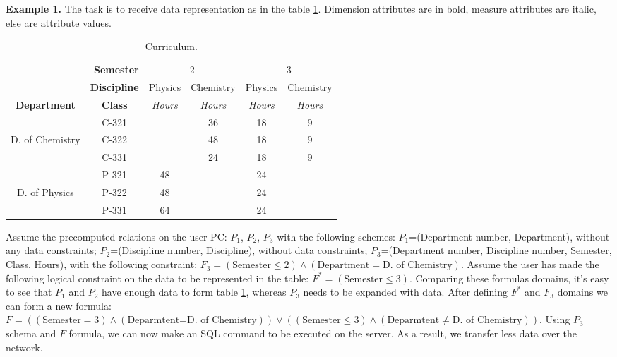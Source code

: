 \documentclass[10pt,a4paper]{article}
\begin{document}
{\bf Example 1.} The task is to receive data representation as in the table
\ref{def_T_1}. Dimension attributes are in bold, measure attributes are italic,
else are attribute values.

\begin{table}[h!]
\caption{\label{def_T_1} Curriculum.}
\begin{center}
\begin{tabular}{|c|c||c|c|c|c|}
\cline{2-6}
\multicolumn{1}{c|}{} & \multicolumn{1}{|r||}{\bf Semester} & \multicolumn{2}{|c|}{2} & \multicolumn{2}{|c|}{3}  \\
\cline{2-6}
\multicolumn{1}{c|}{} & {\bf Discipline} & Physics & Chemistry & Physics & Chemistry \\
\hline \cline{2-6}
{\bf Department} & {\bf Class} & {\it Hours} & {\it Hours} & {\it Hours} & {\it Hours} \\
\hline
 & C-321 & & 36 & 18 & 9 \\
\cline{2-6}
D. of Chemistry & C-322 & & 48 & 18 & 9 \\
\cline{2-6}
 & C-331 & & 24 & 18 & 9 \\
\hline
 & P-321 & 48 & & 24 & \\
\cline{2-6}
D. of Physics & P-322 & 48 & & 24 & \\
\cline{2-6}
 & P-331 & 64 & & 24 & \\
\hline
\end{tabular}
\end{center}
\end{table}
Assume the precomputed relations on the user PC:  $P_1$,
$P_2$, $P_3$ with the following schemes: $P_1$=(Department number, Department), without any data constraints; $P_2$=(Discipline number, Discipline), without data constraints; $P_3$=(Department number, Discipline number, Semester, Class, Hours), with the following constraint:
$F_3 =(\mbox{Semester} \leq 2) \wedge (\mbox{Department} = \mbox{D. of Chemistry})$.
Assume the user has made the following logical constraint on the data to be represented in the table: $F^{\ast} = (\mbox{Semester} \leq 3)$. Comparing these formulas domains, it's easy to see that $P_1$ and $P_2$ have enough data to form table \ref{def_T_1}, whereas $P_3$ needs to be expanded with data. After defining $F^{\ast}$ and $F_3$ domains we can form a new formula: $F=((\mbox{Semester} = 3) \wedge (\mbox{Deparmtent=D. of Chemistry}))
\vee ((\mbox{Semester} \leq 3) \wedge (\mbox{Deparmtent} \neq \mbox{D. of Chemistry}))$. Using $P_3$ schema and $F$ formula, we can now make an SQL command to be executed on the server. As a result, we transfer less data over the network.
\end{document}
